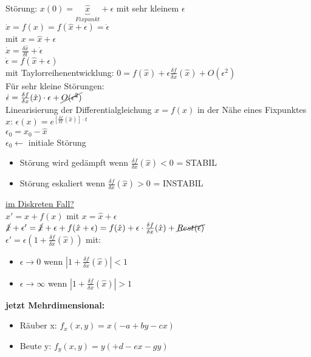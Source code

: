 Störung: $x(0)=\underbrace{\hat{x}}_{Fixpunkt} + \epsilon$ mit sehr kleinem $\epsilon$\\
$\dot{x}=f(x)=f(\hat{x} + \epsilon)=\dot{\epsilon}$\\
mit $x=\hat{x}+\epsilon$\\
$\dot{x}=\frac{\delta \hat{x}}{\delta t} + \dot{\epsilon}$\\
\underline{$\dot{\epsilon}=f(\hat{x}+\epsilon)$}\\
mit Taylorreihenentwicklung: $0=f(\hat{x}) + \epsilon \frac{\delta f}{\delta x} (\hat{x}) + O(\epsilon^2)$\\

Für sehr kleine Störungen:\\
$\dot{\epsilon}=\frac{\delta f}{\delta x} (\hat{x}) \cdot \epsilon + \cancel{O(\epsilon^2)}$\\
Linearisierung der Differentialgleichung $x=f(x)$ in der Nähe eines Fixpunktes $\hat{x}$:
$\epsilon(x)=e^{[\frac{\delta f}{\delta x} (\hat{x})] \cdot t}$\\
$\epsilon_0=x_0 - \hat{x}$\\
$\epsilon_0 \leftarrow $ initiale Störung\\

\begin{itemize}
	\item Störung wird gedämpft wenn $\frac{\delta f}{\delta x} (\hat{x}) < 0$ = STABIL
	\item Störung eskaliert wenn $\frac{\delta f}{\delta x} (\hat{x}) > 0$ = INSTABIL
\end{itemize}

\underline{im Diskreten Fall?}\\
$x'=x + f(x)$ mit $x=\hat{x} + \epsilon$\\
$\cancel{\hat{x}} + \epsilon' = \cancel{\hat{x}} + \epsilon + f(\hat{x} + \epsilon)=f(\hat{x}) + \epsilon \cdot \frac{\delta f}{\delta x} (\hat{x}) + \cancel{Rest(\epsilon)}$\\
$\epsilon'=\epsilon (1 + \frac{\delta f}{\delta x} (\hat{x}))$
mit:
\begin{itemize}
	\item $\epsilon \rightarrow 0$ wenn $|1+\frac{\delta f}{\delta x} (\hat{x})| < 1$
	\item $\epsilon \rightarrow \infty$ wenn $|1+\frac{\delta f}{\delta x} (\hat{x})| > 1$
\end{itemize}

\textbf{jetzt Mehrdimensional:}
\begin{itemize}
	\item Räuber x: $f_x(x,y)=x(-a+by-cx)$
	\item Beute y: $f_y(x,y)=y(+d-ex-gy)$
\end{itemize}

